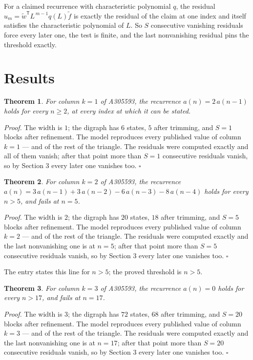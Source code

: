 \documentclass[11pt]{article}
\newtheorem{theorem}{Theorem}
\theoremstyle{definition}
\begin{document}
For a claimed recurrence with characteristic polynomial $q$, the residual $u_m = \tilde w^{\mathsf T}L^{\,m-1}q(L)\tilde f$ is exactly the residual of the claim at one index and itself satisfies the characteristic polynomial of $L$. So $S$ consecutive vanishing residuals force every later one, the test is finite, and the last nonvanishing residual pins the threshold exactly.

\section{Results}

\begin{theorem} For column $k = 1$ of A305593, the recurrence $a(n) = 2\,a(n-1)$ holds for every $n \ge 2$, at every index at which it can be stated.\end{theorem}

{\itshape Proof.} The width is $1$; the digraph has $6$ states, $5$ after trimming, and $S = 1$ blocks after refinement. The model reproduces every published value of column $k = 1$ --- and of the rest of the triangle. The residuals were computed exactly and all of them vanish; after that point more than $S = 1$ consecutive residuals vanish, so by Section 3 every later one vanishes too. $\square$

\begin{theorem} For column $k = 2$ of A305593, the recurrence $a(n) = 3\,a(n-1) + 3\,a(n-2) - 6\,a(n-3) - 8\,a(n-4)$ holds for every $n > 5$, and fails at $n = 5$.\end{theorem}

{\itshape Proof.} The width is $2$; the digraph has $20$ states, $18$ after trimming, and $S = 5$ blocks after refinement. The model reproduces every published value of column $k = 2$ --- and of the rest of the triangle. The residuals were computed exactly and the last nonvanishing one is at $n = 5$; after that point more than $S = 5$ consecutive residuals vanish, so by Section 3 every later one vanishes too. $\square$

The entry states this line for $n > 5$; the proved threshold is $n > 5$.

\begin{theorem} For column $k = 3$ of A305593, the recurrence $a(n) = 0$ holds for every $n > 17$, and fails at $n = 17$.\end{theorem}

{\itshape Proof.} The width is $3$; the digraph has $72$ states, $68$ after trimming, and $S = 20$ blocks after refinement. The model reproduces every published value of column $k = 3$ --- and of the rest of the triangle. The residuals were computed exactly and the last nonvanishing one is at $n = 17$; after that point more than $S = 20$ consecutive residuals vanish, so by Section 3 every later one vanishes too. $\square$
\end{document}
